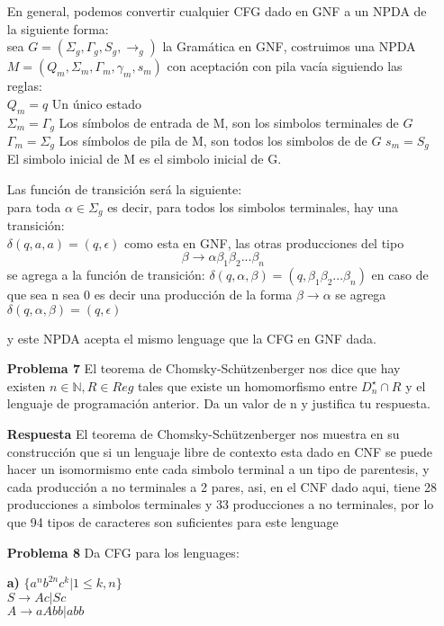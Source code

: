 \documentclass{article}
\begin{document}
\begin{enumerate}
En general, podemos convertir cualquier CFG dado en  GNF a un NPDA de la siguiente forma:\\

sea $G=(\Sigma_g,\Gamma_g,S_g,\rightarrow_g)$ la Gramática en GNF, 
costruimos una NPDA $M=(Q_m,\Sigma_m,\Gamma_m, \gamma_m,s_m)$ con aceptación con pila vacía siguiendo las reglas:\\
$Q_m={q}$ Un único estado\\
$\Sigma_m = \Gamma_g$ Los símbolos de entrada de M, son los simbolos terminales de $G$
$\Gamma_m = \Sigma_g$ Los símbolos de pila de M, son todos los simbolos de de $G$
$s_m = S_g$ El simbolo inicial de M es el simbolo inicial de G.

Las función de transición será la siguiente:\\
para toda $\alpha \in \Sigma_g$ es decir, para todos los simbolos terminales, hay una transición:\\
$\delta(q,a,a)=(q,\epsilon)$
como esta en GNF, las otras producciones del tipo $$\beta \rightarrow \alpha\beta_1\beta_2...\beta_n$$
se agrega a la función de transición:
$\delta(q,\alpha,\beta) = (q,\beta_1\beta_2...\beta_n)$
en caso de que sea n sea 0 es decir una producción de la forma $\beta \rightarrow \alpha$  se agrega $\delta(q,\alpha,\beta) = (q,\epsilon)$

y este NPDA acepta el mismo lenguage que la CFG en GNF dada.

\item[\bf{Problema 7}]  El teorema de Chomsky-Schützenberger nos dice que hay existen $n \in \mathbb{N}, R \in Reg$ tales que existe un homomorfismo entre $D^{\star}_n \cap R$ y el lenguaje de programación anterior. Da un valor de n y justifica tu respuesta.

\item[\bf{Respuesta}]
El teorema de Chomsky-Schützenberger nos muestra en su construcción que si un lenguaje libre de contexto esta dado en CNF se puede hacer un isomormismo ente cada simbolo terminal a un tipo de parentesis, y cada producción a no terminales a 2 pares, asi, en el CNF dado aqui, tiene 28 producciones a simbolos terminales y 33 producciones a no terminales, por lo que 94 tipos de caracteres son suficientes para este lenguage

\item[\bf{Problema 8}]  Da CFG para los lenguages:

\item[\bf{a)}]  $ \{a^{n}b^{2n}c^{k}| 1 \le k,n \}$\\
$S \rightarrow Ac|Sc $\\
$A \rightarrow aAbb|abb $


\end{enumerate}
\end{document}
